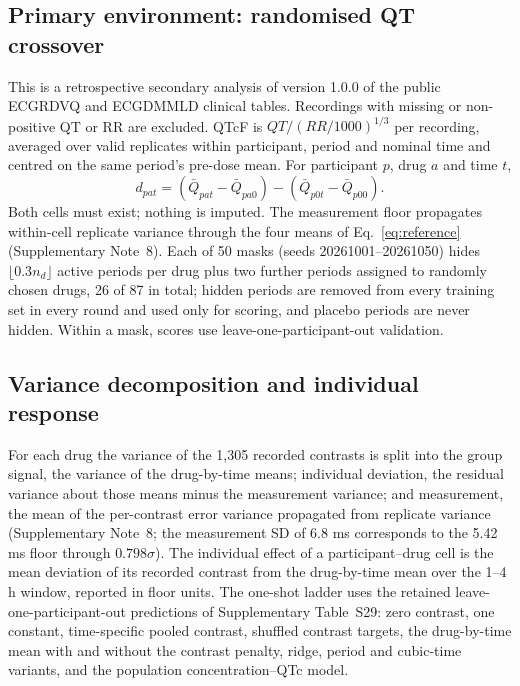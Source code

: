\documentclass[11pt,a4paper]{article}
\begin{document}
\subsection{Primary environment: randomised QT crossover}
This is a retrospective secondary analysis of version 1.0.0 of the public ECGRDVQ and ECGDMMLD clinical tables\cite{ecgrdvq,ecgdmmld,pollardPhysionet2026}. Recordings with missing or non-positive QT or RR are excluded. QTcF is $QT/(RR/1000)^{1/3}$ per recording, averaged over valid replicates within participant, period and nominal time and centred on the same period's pre-dose mean. For participant $p$, drug $a$ and time $t$,
\begin{equation}\label{eq:reference}
d_{pat}=(\bar Q_{pat}-\bar Q_{pa0})-(\bar Q_{p0t}-\bar Q_{p00}).
\end{equation}
Both cells must exist; nothing is imputed. The measurement floor propagates within-cell replicate variance through the four means of Eq.~\ref{eq:reference} (Supplementary Note~8). Each of 50 masks (seeds 20261001--20261050) hides $\lfloor0.3n_d\rfloor$ active periods per drug plus two further periods assigned to randomly chosen drugs, 26 of 87 in total; hidden periods are removed from every training set in every round and used only for scoring, and placebo periods are never hidden. Within a mask, scores use leave-one-participant-out validation.

\subsection{Variance decomposition and individual response}
For each drug the variance of the 1,305 recorded contrasts is split into the group signal, the variance of the drug-by-time means; individual deviation, the residual variance about those means minus the measurement variance; and measurement, the mean of the per-contrast error variance propagated from replicate variance (Supplementary Note~8; the measurement SD of 6.8 ms corresponds to the 5.42 ms floor through $0.798\sigma$). The individual effect of a participant--drug cell is the mean deviation of its recorded contrast from the drug-by-time mean over the 1--4 h window, reported in floor units. The one-shot ladder uses the retained leave-one-participant-out predictions of Supplementary Table~S29: zero contrast, one constant, time-specific pooled contrast, shuffled contrast targets, the drug-by-time mean with and without the contrast penalty, ridge, period and cubic-time variants, and the population concentration--QTc model.
\end{document}
